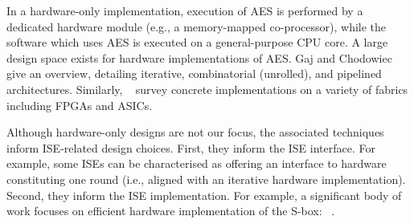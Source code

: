 
In a hardware-only implementation,
execution of 
AES
is 
performed by 
a dedicated hardware module (e.g., a memory-mapped co-processor),
while
the software which uses AES is executed on
a general-purpose CPU core.
A large design space exists for hardware implementations of AES.
Gaj and Chodowiec~\cite[Section 3.3]{GajCho:00}
give an overview, detailing
iterative,
combinatorial (unrolled),
and
pipelined architectures.
Similarly, ~\cite{PMDW:04,GooBen:05,GajCho:09}
survey concrete implementations on a variety of fabrics including FPGAs
and ASICs.

Although hardware-only designs are not our focus, the associated techniques
inform ISE-related design choices.
First,
they inform the ISE interface.
For example, some ISEs can be characterised as offering an interface to
hardware constituting one round 
(i.e., aligned with an iterative hardware implementation).
Second,
they inform the ISE implementation.
For example, a significant body of work focuses on efficient hardware 
implementation of the S-box: ~\cite{Canright:05,BoyPer:12,ReyTahAsh:18}.

